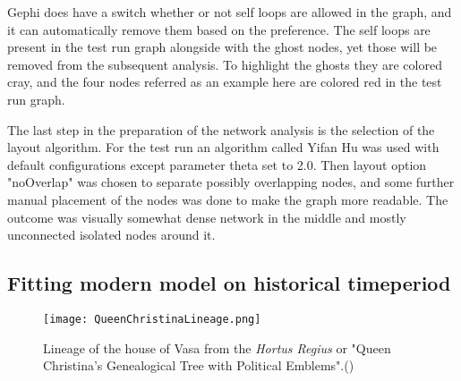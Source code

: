 Gephi does have a switch whether or not self loops are allowed in the graph, and it can automatically remove them based on the preference. The self loops are present in the test run graph alongside with the ghost nodes, yet those will be removed from the subsequent analysis. To highlight the ghosts they are colored cray, and the four nodes referred as an example here are colored red in the test run graph.

The last step in the preparation of the network analysis is the selection of the layout algorithm. For the test run an algorithm called Yifan Hu was used with default configurations except parameter theta set to 2.0. Then layout option "noOverlap" was chosen to separate possibly overlapping nodes, and some further manual placement of the nodes was done to make the graph more readable. The outcome was visually somewhat dense network in the middle and mostly unconnected isolated nodes around it. 

\subsection{Fitting modern model on historical timeperiod}
\begin{figure}[h]
	\texttt{[image: QueenChristinaLineage.png]}
	\caption{Lineage of the house of Vasa from the \textit{Hortus Regius} or "Queen Christina's Genealogical Tree with Political Emblems".(\cite{hortusregius})} 
	\centering
\end{figure}

